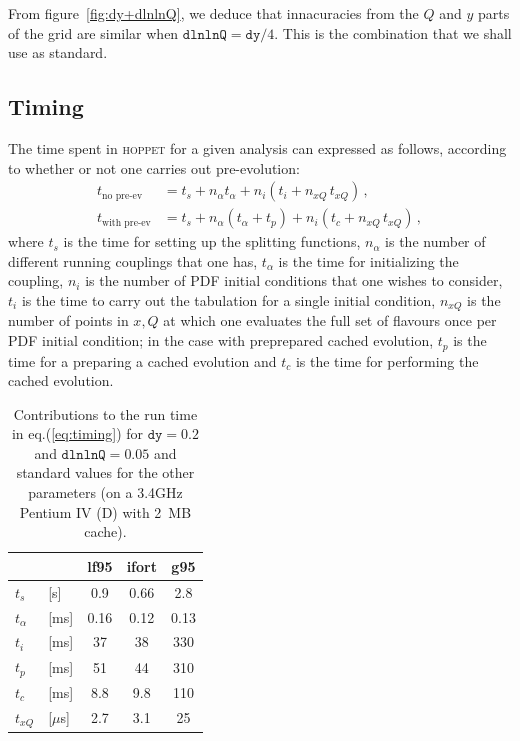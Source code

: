 \documentclass[12pt]{article}
\newcommand{\dy}{\ttt{dy}}
\newcommand{\dlnlnQ}{\ttt{dlnlnQ}}
\newcommand{\hoppet}{\textsc{hoppet}\xspace}
\newcommand{\ttt}[1]{\texttt{#1}}
\begin{document}
From figure~\ref{fig:dy+dlnlnQ}, we deduce that innacuracies from the
$Q$ and $y$ parts of the grid are similar when $\dlnlnQ = \dy /4$.
This is the combination that we shall use as standard.


\subsection{Timing}


The time spent in \hoppet for a given analysis can expressed as
follows, according to whether or not one carries out pre-evolution:
\begin{subequations}
  \label{eq:timing}
  \begin{align}
    t_\text{no pre-ev}   &= t_s + n_\alpha t_\alpha + n_i (t_i  + n_{xQ}\, t_{xQ})\,,\\
    t_\text{with pre-ev} &= t_s + n_\alpha (t_\alpha + t_p) + n_i (t_c + n_{xQ}\,
    t_{xQ})\,,
  \end{align}
\end{subequations}
where $t_s$ is the time for setting up the splitting functions,
$n_\alpha$ is the number of different running couplings that one has,
$t_\alpha$ is the time for initializing the coupling,
%
$n_i$ is the number of PDF initial conditions that one wishes to
consider, $t_i$ is the time to carry out the tabulation for a single
initial condition, $n_{xQ}$ is the number of points in $x,Q$ at which
one evaluates the full set of flavours once per PDF initial condition;
in the case with preprepared cached evolution, $t_p$ is the time for a
preparing a cached evolution and $t_c$ is the time for performing the
cached evolution.

\begin{table}
  \centering
  \begin{tabular}{|ll|c|c|c|}\hline
          &&     lf95  &  ifort   & g95    \\\hline
   $t_s$ &[s]  &  0.9  &  0.66    & 2.8    \\
   $t_\alpha$ & [ms]                
               &  0.16 &  0.12    & 0.13   \\
   $t_i$ &[ms] &  37   &   38     & 330    \\
   $t_p$ &[ms] &  51   &   44     & 310    \\
   $t_c$ &[ms] &  8.8  &   9.8    & 110    \\
   $t_{xQ}$ &[$\mu$s]           
               &  2.7  &   3.1    &  25    \\
   \hline
  \end{tabular}
  \caption{Contributions to the run time in eq.(\ref{eq:timing}) for
    $\dy=0.2$ and 
    $\dlnlnQ=0.05$ and standard values for the other parameters 
    (on a 3.4GHz Pentium IV (D) with 2~MB cache).}
  \label{tab:timings}
%                    
%                    
\end{table}
\end{document}

